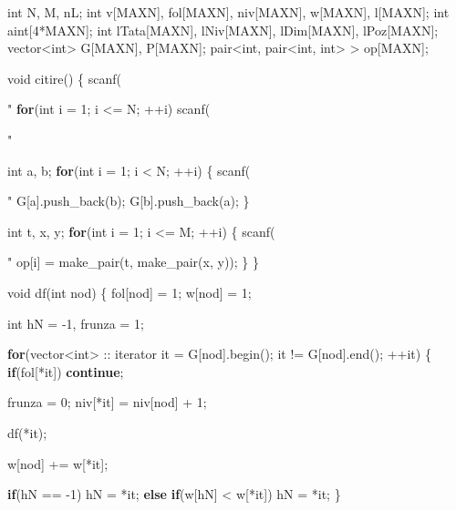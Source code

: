 \documentclass[10pt,]{article}
\newenvironment{Shaded}{}{}
\newcommand{\KeywordTok}[1]{\textcolor[rgb]{0.00,0.44,0.13}{\textbf{{#1}}}}
\newcommand{\DataTypeTok}[1]{\textcolor[rgb]{0.56,0.13,0.00}{{#1}}}
\newcommand{\DecValTok}[1]{\textcolor[rgb]{0.25,0.63,0.44}{{#1}}}
\newcommand{\StringTok}[1]{\textcolor[rgb]{0.25,0.44,0.63}{{#1}}}
\newcommand{\NormalTok}[1]{{#1}}
\begin{document}
\begin{Shaded}
\begin{Highlighting}[]
\DataTypeTok{int} \NormalTok{N, M, nL;}
\DataTypeTok{int} \NormalTok{v[MAXN], fol[MAXN], niv[MAXN], w[MAXN], l[MAXN];}
\DataTypeTok{int} \NormalTok{aint[}\DecValTok{4}\NormalTok{*MAXN];}
\DataTypeTok{int} \NormalTok{lTata[MAXN], lNiv[MAXN], lDim[MAXN], lPoz[MAXN];}
\NormalTok{vector<}\DataTypeTok{int}\NormalTok{> G[MAXN], P[MAXN];}
\NormalTok{pair<}\DataTypeTok{int}\NormalTok{, pair<}\DataTypeTok{int}\NormalTok{, }\DataTypeTok{int}\NormalTok{> > op[MAXN];}

\DataTypeTok{void} \NormalTok{citire()}
\NormalTok{\{}
  \NormalTok{scanf(}\StringTok{"%d%d"}\NormalTok{, &N, &M);}
  \KeywordTok{for}\NormalTok{(}\DataTypeTok{int} \NormalTok{i = }\DecValTok{1}\NormalTok{; i <= N; ++i)}
    \NormalTok{scanf(}\StringTok{"%d"}\NormalTok{, &v[i]);}

  \DataTypeTok{int} \NormalTok{a, b;}
  \KeywordTok{for}\NormalTok{(}\DataTypeTok{int} \NormalTok{i = }\DecValTok{1}\NormalTok{; i < N; ++i) \{}
    \NormalTok{scanf(}\StringTok{"%d%d"}\NormalTok{, &a, &b);}
    \NormalTok{G[a].push_back(b);}
    \NormalTok{G[b].push_back(a);}
  \NormalTok{\}}

  \DataTypeTok{int} \NormalTok{t, x, y;}
  \KeywordTok{for}\NormalTok{(}\DataTypeTok{int} \NormalTok{i = }\DecValTok{1}\NormalTok{; i <= M; ++i) \{}
    \NormalTok{scanf(}\StringTok{"%d%d%d"}\NormalTok{, &t, &x, &y);}
    \NormalTok{op[i] = make_pair(t, make_pair(x, y));}
  \NormalTok{\}}
\NormalTok{\}}

\DataTypeTok{void} \NormalTok{df(}\DataTypeTok{int} \NormalTok{nod)}
\NormalTok{\{}
  \NormalTok{fol[nod] = }\DecValTok{1}\NormalTok{;}
  \NormalTok{w[nod] = }\DecValTok{1}\NormalTok{;}

  \DataTypeTok{int} \NormalTok{hN = -}\DecValTok{1}\NormalTok{, frunza = }\DecValTok{1}\NormalTok{;}

  \KeywordTok{for}\NormalTok{(vector<}\DataTypeTok{int}\NormalTok{> :: iterator it = G[nod].begin(); it != G[nod].end(); ++it) \{}
    \KeywordTok{if}\NormalTok{(fol[*it])}
      \KeywordTok{continue}\NormalTok{;}

    \NormalTok{frunza = }\DecValTok{0}\NormalTok{;}
    \NormalTok{niv[*it] = niv[nod] + }\DecValTok{1}\NormalTok{;}

    \NormalTok{df(*it);}

    \NormalTok{w[nod] += w[*it];}

    \KeywordTok{if}\NormalTok{(hN == -}\DecValTok{1}\NormalTok{)}
      \NormalTok{hN = *it;}
    \KeywordTok{else}
      \KeywordTok{if}\NormalTok{(w[hN] < w[*it])}
        \NormalTok{hN = *it;}
  \NormalTok{\}}

}}}}
\end{Highlighting}
\end{Shaded}
\end{document}
